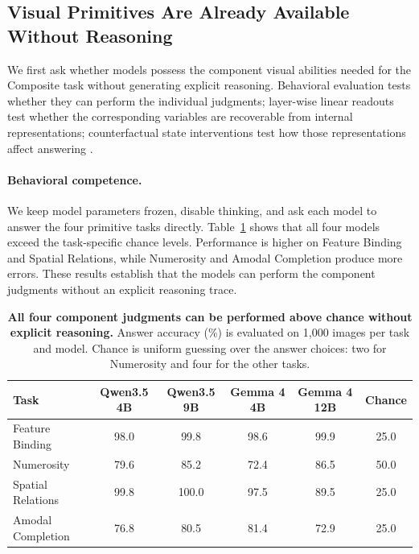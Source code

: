 \documentclass{article} %
\begin{document}
\subsection{Visual Primitives Are Already Available Without Reasoning}
\label{sec:answer_ready_states}

We first ask whether models possess the component visual abilities needed for the Composite task without generating explicit reasoning. Behavioral evaluation tests whether they can perform the individual judgments; layer-wise linear readouts test whether the corresponding variables are recoverable from internal representations; counterfactual state interventions test how those representations affect answering \citep{belinkov2021probing}.

\paragraph{Behavioral competence.}
We keep model parameters frozen, disable thinking, and ask each model to answer the four primitive tasks directly. Table~\ref{tab:primitive_behavior} shows that all four models exceed the task-specific chance levels. Performance is higher on Feature Binding and Spatial Relations, while Numerosity and Amodal Completion produce more errors. These results establish that the models can perform the component judgments without an explicit reasoning trace.

\begin{table}[H]
    \centering
    \small
    \setlength{\tabcolsep}{4.5pt}
    \caption{\textbf{All four component judgments can be performed above chance without explicit reasoning.} Answer accuracy (\%) is evaluated on 1,000 images per task and model. Chance is uniform guessing over the answer choices: two for Numerosity and four for the other tasks.}
    \label{tab:primitive_behavior}
    \begin{tabular}{lccccc}
        \toprule
        Task
        & Qwen3.5 4B
        & Qwen3.5 9B
        & Gemma 4 4B
        & Gemma 4 12B
        & Chance \\
        \midrule
        Feature Binding
        & 98.0
        & 99.8
        & 98.6
        & 99.9
        & 25.0 \\
        Numerosity
        & 79.6
        & 85.2
        & 72.4
        & 86.5
        & 50.0 \\
        Spatial Relations
        & 99.8
        & 100.0
        & 97.5
        & 89.5
        & 25.0 \\
        Amodal Completion
        & 76.8
        & 80.5
        & 81.4
        & 72.9
        & 25.0 \\
        \bottomrule
    \end{tabular}
\end{table}
\end{document}

